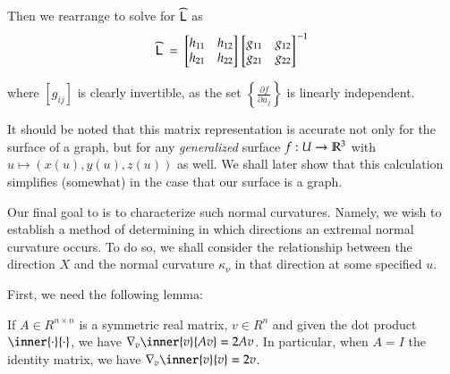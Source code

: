 	Then we rearrange to solve for $\widehat{\mathsf{L}}$ as
		\begin{equation} \label{weinmatconstruction}
		\widehat{\mathsf{L}}
		\;=\; \begin{bmatrix} h_{11} & h_{12} \\ h_{21} & h_{22} \end{bmatrix}
		\left.\begin{bmatrix} g_{11} & g_{12} \\ g_{21} & g_{22} \end{bmatrix}\right.^{-1}
		\end{equation}
	
	where $\left[ g_{ij} \right]$ is clearly invertible, as the set
	$\left\{\frac{\partial f}{\partial u_j}\right\}$ is linearly independent.
	
	It should be noted that this matrix representation is accurate not only for the surface of a graph, but for any \textit{generalized} surface
	$f: U \to \mathbb{R}^3 $ with $u \mapsto (x(u), y(u), z(u))$ as well. We shall later show that this calculation simplifies (somewhat) in the case that our surface is a graph.
	
	
	Our final goal to is to characterize such normal curvatures.
	Namely, we wish to establish a method of determining in which directions an extremal
	normal curvature occurs.
	To do so, we shall consider the relationship between the direction $X$ and the normal curvature $\kappa_\nu$ in that direction at some specified $u$.


	
	First, we need the following lemma:
    \begin{lemma}
        If $A\in R^{n\times n}$ is a symmetric real matrix, $v \in R^n$
        and given the dot product $\inner{\cdot}{\cdot}$,
        we have $\nabla_{v} \inner{v}{Av} = 2Av$.
        In particular, when $A = I$ the identity matrix, we have
        $ \nabla_{v} \inner{v}{v} = 2v$.
    \end{lemma}
    
